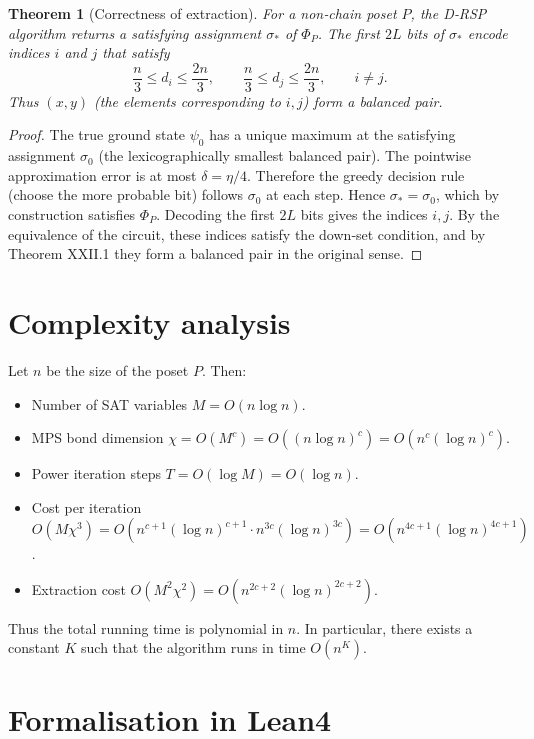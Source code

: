 \documentclass[11pt,a4paper]{article}
\newtheorem{theorem}{Theorem}[section]
\begin{document}
\begin{theorem}[Correctness of extraction]\label{thm:drsp}
For a non‑chain poset $P$, the D‑RSP algorithm returns a satisfying assignment $\sigma_*$ of $\Phi_P$. The first $2L$ bits of $\sigma_*$ encode indices $i$ and $j$ that satisfy
\[
\frac{n}{3} \le d_i \le \frac{2n}{3},\qquad \frac{n}{3} \le d_j \le \frac{2n}{3},\qquad i \neq j.
\]
Thus $(x,y)$ (the elements corresponding to $i,j$) form a balanced pair.
\end{theorem}
\begin{proof}
The true ground state $\psi_0$ has a unique maximum at the satisfying assignment $\sigma_0$ (the lexicographically smallest balanced pair). The pointwise approximation error is at most $\delta = \eta/4$. Therefore the greedy decision rule (choose the more probable bit) follows $\sigma_0$ at each step. Hence $\sigma_* = \sigma_0$, which by construction satisfies $\Phi_P$. Decoding the first $2L$ bits gives the indices $i,j$. By the equivalence of the circuit, these indices satisfy the down‑set condition, and by Theorem XXII.1 they form a balanced pair in the original sense.
\end{proof}

\section{Complexity analysis}

Let $n$ be the size of the poset $P$. Then:
\begin{itemize}
\item Number of SAT variables $M = O(n \log n)$.
\item MPS bond dimension $\chi = O(M^c) = O((n \log n)^c) = O(n^c (\log n)^c)$.
\item Power iteration steps $T = O(\log M) = O(\log n)$.
\item Cost per iteration $O(M\chi^3) = O(n^{c+1} (\log n)^{c+1} \cdot n^{3c} (\log n)^{3c}) = O(n^{4c+1} (\log n)^{4c+1})$.
\item Extraction cost $O(M^2 \chi^2) = O(n^{2c+2} (\log n)^{2c+2})$.
\end{itemize}
Thus the total running time is polynomial in $n$. In particular, there exists a constant $K$ such that the algorithm runs in time $O(n^K)$.

\section{Formalisation in Lean4}
\end{document}
